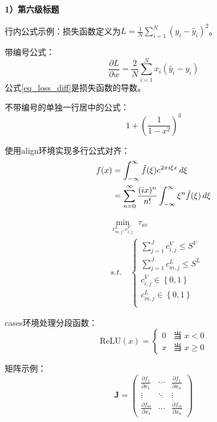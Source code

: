 \documentclass{jyuthesis}
\begin{document}
\textbf{1）第六级标题}

行内公式示例：损失函数定义为$L = \frac{1}{N}\sum_{i=1}^N(y_i-\hat{y}_i)^2$。

带编号公式：
\begin{equation}
    \frac{\partial L}{\partial w} = \frac{2}{N}\sum_{i=1}^N x_i(\hat{y}_i - y_i)
    \label{eq_loss_diff}
\end{equation}
公式\eqref{eq_loss_diff}是损失函数的导数。

不带编号的单独一行居中的公式：
\begin{equation*}
1 + (\frac{1}{1-x^2})^3 
\end{equation*}

使用align环境实现多行公式对齐：
\begin{align}
    f(x) &= \int_{-\infty}^\infty \hat{f}(\xi)e^{2\pi i \xi x} \,d\xi \notag \\ 
         &= \sum_{n=0}^\infty \frac{(ix)^n}{n!}\int_{-\infty}^\infty \xi^n\hat{f}(\xi)\,d\xi 
    \label{eq_fourier}
\end{align}

\begin{equation*}
\begin{split}
&\min_{c_{m,j}^{L},c_{i,j}^{V}} \,\, \tau_{av} \\
&s.t.\quad  
\left\{\begin{array}{lc}
    \sum_{j=1}^{J}c_{i,j}^{V}\leq S^V    \\
    \sum_{j=1}^{J}c_{m,j}^{L}\leq S^L    \\
    c_{i,j}^{V}\in \left \{0,1\right \}  \\
    c_{m,j}^{L}\in \left \{0,1\right \}  \\
\end{array}\right.
\end{split}
\end{equation*}

cases环境处理分段函数：
\[
    \text{ReLU}(x) = 
    \begin{cases}
        0 & \text{当 } x < 0 \\
        x & \text{当 } x \geq 0
    \end{cases}
\]

矩阵示例：
\[
    \mathbf{J} = 
    \begin{pmatrix}
        \frac{\partial f_1}{\partial x_1} & \cdots & \frac{\partial f_1}{\partial x_n} \\
        \vdots & \ddots & \vdots \\
        \frac{\partial f_m}{\partial x_1} & \cdots & \frac{\partial f_m}{\partial x_n}
    \end{pmatrix}
\]
\end{document}

